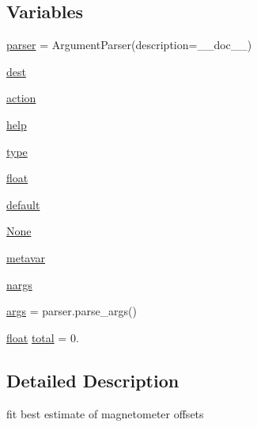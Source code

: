 \subsection*{Variables}
\begin{DoxyCompactItemize}
\item 
\mbox{\hyperlink{namespacepymavlink_1_1tools_1_1magfit__gps_ab6b7e52bfb62d8f23156f6943dc01d1a}{parser}} = Argument\+Parser(description=\+\_\+\+\_\+doc\+\_\+\+\_\+)
\item 
\mbox{\hyperlink{namespacepymavlink_1_1tools_1_1magfit__gps_ae10944b78f7d03cb1c78a5e9763c979a}{dest}}
\item 
\mbox{\hyperlink{namespacepymavlink_1_1tools_1_1magfit__gps_a005f587c63c9518cc0aca1f07fcc196b}{action}}
\item 
\mbox{\hyperlink{namespacepymavlink_1_1tools_1_1magfit__gps_a3f6fa40120289dfb120c9396b80195e0}{help}}
\item 
\mbox{\hyperlink{namespacepymavlink_1_1tools_1_1magfit__gps_a004b6dfbf5290a554bfda553dbe01f6e}{type}}
\item 
\mbox{\hyperlink{namespacepymavlink_1_1tools_1_1magfit__gps_ad7c096438beeb93459cb78fc9c7838e4}{float}}
\item 
\mbox{\hyperlink{namespacepymavlink_1_1tools_1_1magfit__gps_a7ba8896c4a99fae0ebc7ebdb05960e7a}{default}}
\item 
\mbox{\hyperlink{namespacepymavlink_1_1tools_1_1magfit__gps_a7cc8f3ed5e508a097ae250f70d8cf307}{None}}
\item 
\mbox{\hyperlink{namespacepymavlink_1_1tools_1_1magfit__gps_aa36b0fa265b0a1c2c16bbecd441f4bbe}{metavar}}
\item 
\mbox{\hyperlink{namespacepymavlink_1_1tools_1_1magfit__gps_ad3c8ecbb43e70d3144407b8b4603376c}{nargs}}
\item 
\mbox{\hyperlink{namespacepymavlink_1_1tools_1_1magfit__gps_a09012c05af1eb5cdb7501a4de3f35bdb}{args}} = parser.\+parse\+\_\+args()
\item 
\mbox{\hyperlink{namespacepymavlink_1_1tools_1_1magfit__gps_ad7c096438beeb93459cb78fc9c7838e4}{float}} \mbox{\hyperlink{namespacepymavlink_1_1tools_1_1magfit__gps_a1e7c162e0833dfd689228f0efe1766c1}{total}} = 0.
\end{DoxyCompactItemize}


\subsection{Detailed Description}
\begin{DoxyVerb}fit best estimate of magnetometer offsets
\end{DoxyVerb}
 

